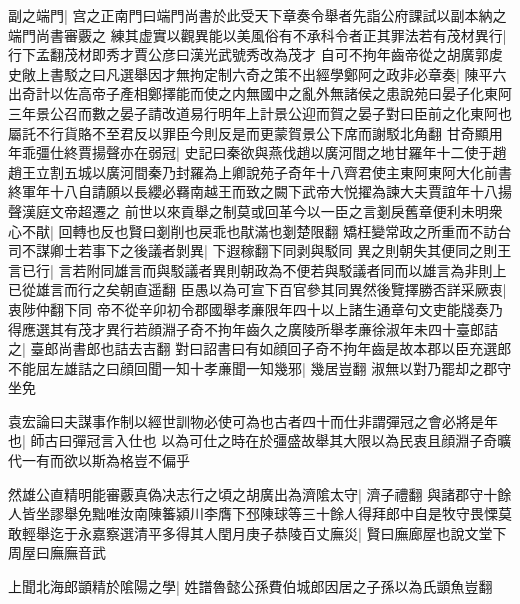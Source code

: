 副之端門|{
	宫之正南門曰端門尚書於此受天下章奏令舉者先詣公府課試以副本納之端門尚書審覈之}
練其虚實以觀異能以美風俗有不承科令者正其罪法若有茂材異行|{
	行下孟翻茂材即秀才賈公彦曰漢光武號秀改為茂才}
自可不拘年齒帝從之胡廣郭䖍史敞上書駁之曰凡選舉因才無拘定制六奇之策不出經學鄭阿之政非必章奏|{
	陳平六出奇計以佐高帝子產相鄭擇能而使之内無國中之亂外無諸侯之患說苑曰晏子化東阿三年景公召而數之晏子請改道易行明年上計景公迎而賀之晏子對曰臣前之化東阿也屬託不行貨賂不至君反以罪臣今則反是而更蒙賀景公下席而謝駁北角翻}
甘奇顯用年乖彊仕終賈揚聲亦在弱冠|{
	史記曰秦欲與燕伐趙以廣河間之地甘羅年十二使于趙趙王立割五城以廣河間秦乃封羅為上卿說苑子奇年十八齊君使主東阿東阿大化前書終軍年十八自請願以長纓必羇南越王而致之闕下武帝大悦擢為諫大夫賈誼年十八揚聲漢庭文帝超遷之}
前世以來貢舉之制莫或回革今以一臣之言剗戾舊章便利未明衆心不猒|{
	回轉也反也賢曰剗削也戻乖也猒滿也剗楚限翻}
矯枉變常政之所重而不訪台司不謀卿士若事下之後議者剝異|{
	下遐稼翻下同剥與駁同}
異之則朝失其便同之則王言已行|{
	言若附同雄言而與駁議者異則朝政為不便若與駁議者同而以雄言為非則上已從雄言而行之矣朝直遥翻}
臣愚以為可宣下百官參其同異然後覽擇勝否詳采厥衷|{
	衷陟仲翻下同}
帝不從辛卯初令郡國舉孝亷限年四十以上諸生通章句文吏能牋奏乃得應選其有茂才異行若顔淵子奇不拘年齒久之廣陵所舉孝亷徐淑年未四十臺郎詰之|{
	臺郎尚書郎也詰去吉翻}
對曰詔書曰有如顔回子奇不拘年齒是故本郡以臣充選郎不能屈左雄詰之曰顔回聞一知十孝亷聞一知幾邪|{
	幾居豈翻}
淑無以對乃罷却之郡守坐免

袁宏論曰夫謀事作制以經世訓物必使可為也古者四十而仕非謂彈冠之會必將是年也|{
	師古曰彈冠言入仕也}
以為可仕之時在於彊盛故舉其大限以為民衷且顔淵子奇曠代一有而欲以斯為格豈不偏乎

然雄公直精明能審覈真偽决志行之頃之胡廣出為濟隂太守|{
	濟子禮翻}
與諸郡守十餘人皆坐謬舉免黜唯汝南陳䉒潁川李膺下邳陳球等三十餘人得拜郎中自是牧守畏慄莫敢輕舉迄于永嘉察選清平多得其人閏月庚子恭陵百丈廡災|{
	賢曰廡廊屋也說文堂下周屋曰廡廡音武}


上聞北海郎顗精於隂陽之學|{
	姓譜魯懿公孫費伯城郎因居之子孫以為氏顗魚豈翻}


